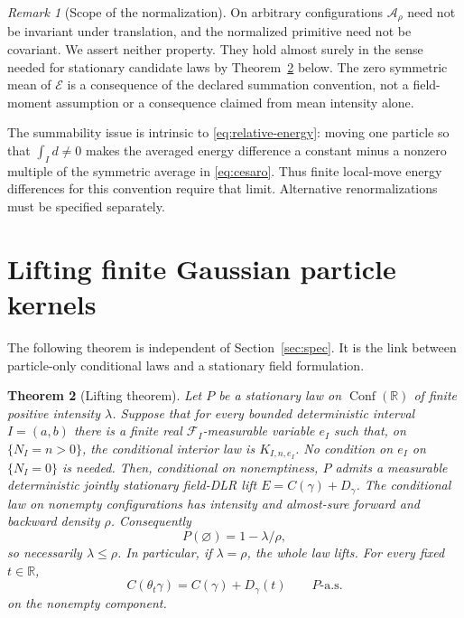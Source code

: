 \documentclass[11pt,reqno]{amsart}
\newtheorem{theorem}{Theorem}[section]
\theoremstyle{definition}
\theoremstyle{remark}
\newtheorem{remark}[theorem]{Remark}
\newcommand{\R}{\mathbb R}
\newcommand{\1}{\mathbf 1}
\newcommand{\Conf}{\operatorname{Conf}}
\newcommand{\cF}{\mathcal F}
\newcommand{\cA}{\mathcal A}
\numberwithin{equation}{section}
\begin{document}
\begin{remark}[Scope of the normalization]\label{rem:scope}
On arbitrary configurations $\cA_\rho$ need not be invariant under
translation, and the normalized primitive need not be covariant.
We assert neither property. They hold almost surely in the sense needed
for stationary candidate laws by Theorem~\ref{thm:lift} below.
The zero symmetric mean of $\mathcal E$ is a consequence of the declared
summation convention, not a field-moment assumption or a consequence
claimed from mean intensity alone.

The summability issue is intrinsic to \eqref{eq:relative-energy}:
moving one particle so that $\int_I d\ne0$ makes the averaged energy
difference a constant minus a nonzero multiple of the symmetric average
in \eqref{eq:cesaro}. Thus finite local-move energy differences for this
convention require that limit. Alternative renormalizations must be
specified separately.
\end{remark}

\section{Lifting finite Gaussian particle kernels}\label{sec:lift}

The following theorem is independent of Section~\ref{sec:spec}.
It is the link between particle-only conditional laws and a stationary
field formulation.

\begin{theorem}[Lifting theorem]\label{thm:lift}
Let $P$ be a stationary law on $\Conf(\R)$ of finite positive intensity
$\lambda$. Suppose that for every bounded deterministic interval
$I=(a,b)$ there is a finite real $\cF_I$-measurable variable $e_I$ such
that, on $\{N_I=n>0\}$, the conditional interior law is
$K_{I,n,e_I}$. No condition on $e_I$ on $\{N_I=0\}$ is needed.
Then, conditional on nonemptiness, $P$ admits a measurable deterministic
jointly stationary field-DLR lift $E=C(\gamma)+D_\gamma$.
The conditional law on nonempty configurations has intensity and
almost-sure forward and backward density $\rho$. Consequently
\begin{equation}\label{eq:empty-mass}
P(\varnothing)=1-\lambda/\rho,
\end{equation}
so necessarily $\lambda\le\rho$. In particular, if $\lambda=\rho$,
the whole law lifts. For every fixed $t\in\R$,
\begin{equation}\label{eq:lift-covariance}
C(\theta_t\gamma)=C(\gamma)+D_\gamma(t)\qquad P\text{-a.s.}
\end{equation}
on the nonempty component.
\end{theorem}
\end{document}
